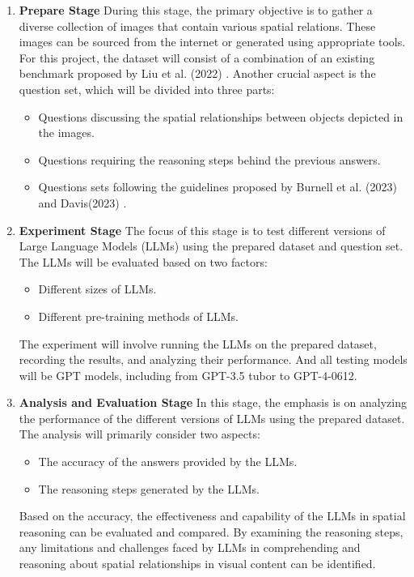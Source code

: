 \documentclass[journal,10pt]{IEEEtran}
\begin{document}
\begin{enumerate}
    \item \textbf{Prepare Stage}
    \subitem During this stage, the primary objective is to gather a diverse collection of images that contain various spatial relations. These images can be sourced from the internet or generated using appropriate tools. For this project, the dataset will consist of a combination of an existing benchmark proposed by Liu et al. (2022) \cite{liu2022visual}.
    Another crucial aspect is the question set, which will be divided into three parts:
    \begin{itemize}
        \item Questions discussing the spatial relationships between objects depicted in the images.
        \item Questions requiring the reasoning steps behind the previous answers.
        \item Questions sets following the guidelines proposed by Burnell et al. (2023) and Davis(2023) \cite{burnell2023rethink,davis2023benchmarks}.
    \end{itemize}
    \item \textbf{Experiment Stage}
    \subitem The focus of this stage is to test different versions of Large Language Models (LLMs) using the prepared dataset and question set. The LLMs will be evaluated based on two factors:
    \begin{itemize}
        \item Different sizes of LLMs.
        \item Different pre-training methods of LLMs.
    \end{itemize}
    The experiment will involve running the LLMs on the prepared dataset, recording the results, and analyzing their performance. And all testing models will be GPT models, including from GPT-3.5 tubor to GPT-4-0612.
    \item \textbf{Analysis and Evaluation Stage}
    \subitem In this stage, the emphasis is on analyzing the performance of the different versions of LLMs using the prepared dataset. The analysis will primarily consider two aspects:
    \begin{itemize}
        \item The accuracy of the answers provided by the LLMs.
        \item The reasoning steps generated by the LLMs.
    \end{itemize}
    Based on the accuracy, the effectiveness and capability of the LLMs in spatial reasoning can be evaluated and compared. By examining the reasoning steps, any limitations and challenges faced by LLMs in comprehending and reasoning about spatial relationships in visual content can be identified.
\end{enumerate}
\end{document}
